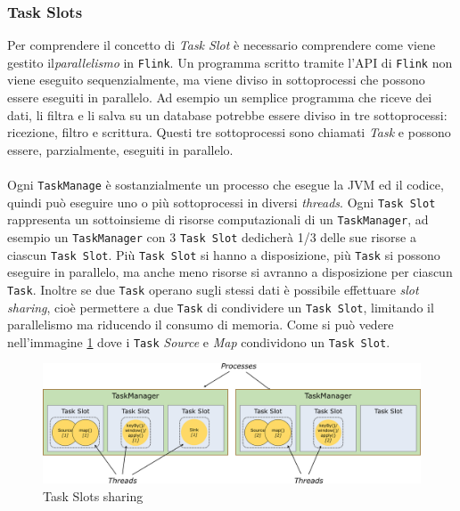 \subsubsection{Task Slots}
\label{subsubsec:flink_Task_slots}
Per comprendere il concetto di \textit{Task Slot} è necessario comprendere come viene gestito il\textit{parallelismo} in \texttt{Flink}.    
Un programma scritto tramite l'API di \texttt{Flink} non viene eseguito sequenzialmente, ma viene diviso in sottoprocessi che possono essere eseguiti in parallelo.
Ad esempio un semplice programma che riceve dei dati, li filtra e li salva su un database potrebbe essere diviso in tre sottoprocessi: ricezione, filtro e scrittura.
Questi tre sottoprocessi sono chiamati \textit{Task} e possono essere, parzialmente, eseguiti in parallelo.
\\\\
Ogni \texttt{TaskManage} è sostanzialmente un processo che esegue la JVM ed il codice, quindi può eseguire uno o più sottoprocessi in diversi \textit{threads}.
Ogni \texttt{Task Slot} rappresenta un sottoinsieme di risorse computazionali di un \texttt{TaskManager}, ad esempio un \texttt{TaskManager}
con 3 \texttt{Task Slot} dedicherà 1/3 delle sue risorse a ciascun \texttt{Task Slot}.
Più \texttt{Task Slot} si hanno a disposizione, più \texttt{Task} si possono eseguire in parallelo, ma anche meno risorse si avranno a disposizione per ciascun \texttt{Task}.
Inoltre se due \texttt{Task} operano sugli stessi dati è possibile effettuare \textit{slot sharing}, cioè permettere a due \texttt{Task} di condividere un \texttt{Task Slot}, limitando il parallelismo ma riducendo il consumo di memoria.
Come si può vedere nell'immagine \ref{fig:flink_slots} dove i \texttt{Task} \textit{Source} e \textit{Map} condividono un \texttt{Task Slot}.
\begin{figure}[htbp]
    \centering
    \includegraphics[width=\textwidth]{images/flink/Tasks_slots.jpg}
    \caption{Task Slots sharing}
    \label{fig:flink_slots}
\end{figure}